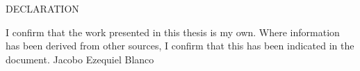 \thispagestyle{empty}
\begin{center}
\vspace{3cm}
{\LARGE DECLARATION}
\vspace*{1cm}
\end{center}
I confirm that the work presented in this thesis is my own. Where information has been derived from other sources, I confirm that this has been indicated in the document.
Jacobo Ezequiel Blanco